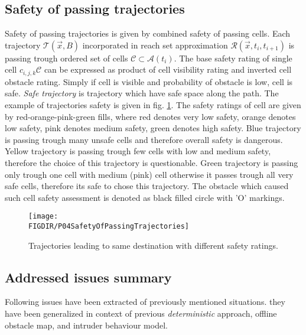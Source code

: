 \subsection{Safety of passing trajectories}
\noindent Safety of passing trajectories is given by combined safety of passing cells. Each trajectory $\mathscr{T}(\vec{x},B)$ incorporated in reach set approximation $\mathscr{R}(\vec{x},t_i,t_{i+1})$ is passing trough ordered set of cells $\mathscr{C}\subset\mathscr{A}(t_i)$. The base safety rating of single cell $c_{i,j,k}\mathscr{C}$ can be expressed as product of cell visibility rating and inverted cell obstacle rating. Simply if cell is visible and probability of obstacle is low, cell is safe. \emph{Safe trajectory} is trajectory which have safe space along the path. The example of trajectories safety is given in fig. \ref{fig:P04SafetyOfPassingTrajectories}. The safety ratings of cell are given by red-orange-pink-green fills, where red denotes very low safety, orange denotes low safety, pink denotes medium safety, green denotes high safety. Blue trajectory is passing trough many unsafe cells and therefore overall safety is dangerous. Yellow trajectory is passing trough few cells with low and medium safety, therefore the choice of this trajectory is questionable. Green trajectory is passing only trough one cell with medium (pink) cell otherwise it passes trough all very safe cells, therefore its safe to chose this trajectory. The obstacle which caused such cell safety assessment is denoted as black filled circle with 'O' markings.

\begin{figure}[htbp]
    \centering
    \texttt{[image: \\FIGDIR/P04SafetyOfPassingTrajectories]}
    \caption{Trajectories leading to same destination with different safety ratings.}
    \label{fig:P04SafetyOfPassingTrajectories}
\end{figure}

\subsection{Addressed issues summary}
\noindent Following issues have been extracted of previously mentioned situations. they have been generalized in context of previous \emph{deterministic} approach, offline obstacle map, and intruder behaviour model.

